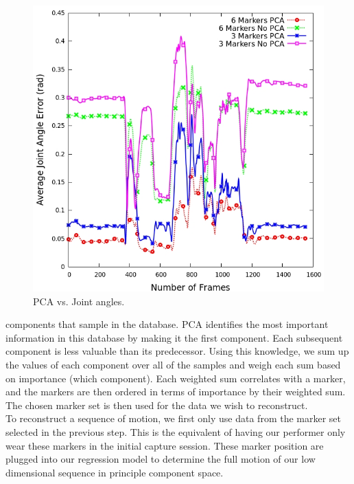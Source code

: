 \begin{figure}[ht]
  \centering
  \includegraphics{images/avgError_6_3_jangles_babySigns1.jpg}
  \caption{PCA vs. Joint angles.}
\end{figure}

  components that 
sample in the database. PCA identifies the most important information 
in this database by making it the first component. Each subsequent 
component is less valuable than its predecessor. Using this knowledge, 
we sum up the values of each component over all of the samples and 
weigh each sum based on importance (which component). Each weighted 
sum correlates with a marker, and the markers are then ordered in terms 
of importance by their weighted sum. The chosen marker set is then 
used for the data we wish to reconstruct. \\

To reconstruct a sequence of motion, we first only use data from the 
marker set selected in the previous step. This is the equivalent of 
having our performer only wear these markers in the initial capture 
session. These marker position are plugged into our regression model 
to determine the full motion of our low dimensional sequence in 
principle component space. \\



